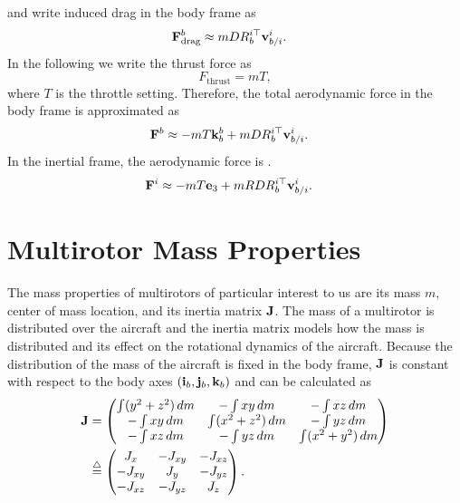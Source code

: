 and write induced drag in the body frame as
\begin{align*}
	\Fbf_\text{drag}^b &\approx mD R_b^{i\top} \vbf_{b/i}^i.	\label{eq:induced drag}
\end{align*}
In the following we write the thrust force as
\[
F_{\text{thrust}} = mT,
\]
where $T$ is the throttle setting.  
%
Therefore, the total aerodynamic force in the body frame is approximated as
\begin{align}
	\mathbf{F}^b &\approx - mT \mathbf{k}_b^b + mD R_b^{i\top} \mathbf{v}_{b/i}^i.
\end{align}
In the inertial frame, the aerodynamic force is .
\begin{align}
	\mathbf{F}^i &\approx - m T \mathbf{e}_3 + m R D R_b^{i\top} \mathbf{v}_{b/i}^i.
\end{align}


\section{Multirotor Mass Properties}
The mass properties of multirotors of particular interest to us are its mass $m$, center of mass location, and its inertia matrix $\mathbf{J}$. The mass of a multirotor is distributed over the aircraft and the inertia matrix models how the mass is distributed and its effect on the rotational dynamics of the aircraft. Because the distribution of the mass of the aircraft is fixed in the body frame, $\mathbf{J}$ is constant with respect to the body axes $(\mathbf{i}_b, \mathbf{j}_b, \mathbf{k}_b)$ and can be calculated as
\begin{align*}
\mathbf{J} &=
    \begin{pmatrix}
    \int (y^2 + z^2)\,dm & -\int xy\,dm         & -\int xz\,dm \\
    -\int xy\,dm         & \int (x^2 + z^2)\,dm &  -\int yz\,dm \\
    -\int xz\,dm         & -\int yz\,dm         & \int (x^2 + y^2)\,dm
    \end{pmatrix} \\
&\stackrel{\triangle}{=}
    \begin{pmatrix}
    J_{x}   & -J_{xy} & -J_{xz} \\
    -J_{xy} & J_{y}   & -J_{yz} \\
    -J_{xz} & -J_{yz} & J_{z}
    \end{pmatrix} .
\end{align*}

